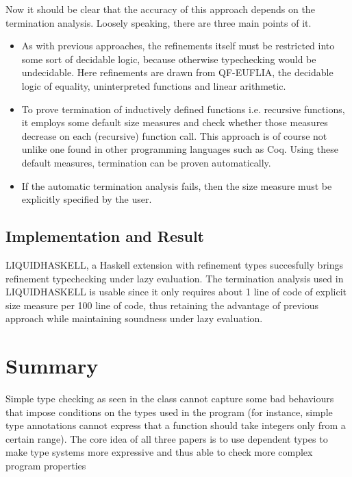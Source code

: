 \documentclass[a4paper,UKenglish]{lipics-v2016}
\begin{document}
      Now it should be clear that the accuracy of this approach depends on the
      termination analysis.  Loosely speaking, there are three main points of
      it.
      \begin{itemize}
        \item As with previous approaches, the refinements itself must be
          restricted into some sort of decidable logic, because otherwise
          typechecking would be undecidable.  Here refinements are drawn from
          QF-EUFLIA, the decidable logic of equality, uninterpreted
          functions and linear arithmetic.
        \item To prove termination of inductively defined functions i.e.
          recursive functions, it employs some default size measures and check
          whether those measures decrease on each (recursive) function call.
          This approach is of course not unlike one found in other programming
          languages such as Coq. Using these default measures, termination can
          be proven automatically.
        \item If the automatic termination analysis fails, then the size
          measure must be explicitly specified by the user.
      \end{itemize}

    \subsection{Implementation and Result}

      LIQUIDHASKELL, a Haskell extension with refinement types succesfully
      brings refinement typechecking under lazy evaluation.  The termination
      analysis used in LIQUIDHASKELL is usable since it only requires about 1
      line of code of explicit size measure per 100 line of code, thus
      retaining the advantage of previous approach while maintaining soundness
      under lazy evaluation.

\section{Summary}

Simple type checking as seen in the class cannot capture some bad behaviours
that impose conditions on the types used in the program (for instance, simple
type annotations cannot express that a function should take integers only from
a certain range). The core idea of all three papers is to use dependent types
to make type systems more expressive and thus able to check more complex
program properties
\end{document}
